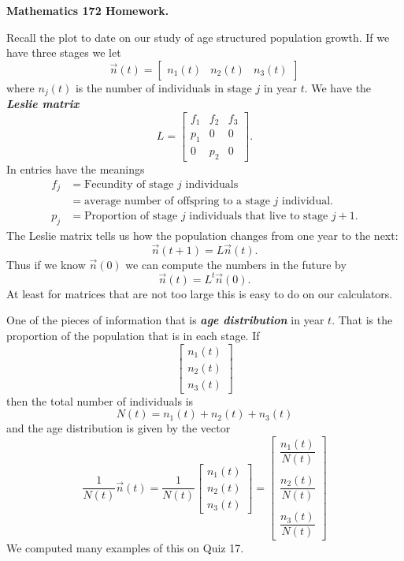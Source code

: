 \documentclass[11pt]{amsart}
\title[]{}
\newcommand{\bi}[1]{{\bf\itshape #1\/}}  %
\renewcommand{\(}{\left(}
\renewcommand{\)}{\right)}
\renewcommand{\[}{\left[}
\renewcommand{\]}{\right]}
\theoremstyle{definition}
\theoremstyle{remark}
\begin{document}
\thispagestyle{empty}

\centerline{\bf \large Mathematics 172 Homework.}



Recall the plot to date on our study of age structured population growth.
If we have three stages we let
$$
\vec n(t) = \[ \begin{matrix} n_1(t)& n_2(t) & n_3(t) \end{matrix}\]
$$
where $n_j(t)$ is the number of individuals in stage $j$ in year $t$.
We have the \bi{Leslie matrix} 
$$
L = \[ \begin{matrix}
f_1&f_2&  f_3\\
p_1 & 0& 0 \\
0& p_2& 0
\end{matrix}\].
$$
In entries have the meanings
\begin{align*}
f_j&=\text{Fecundity of stage $j$ individuals}\\
&= \text{average number of offspring to a stage $j$ individual.}\\ 
p_j& =\text{Proportion of stage $j$ individuals that live to stage $j+1$.}
\end{align*}
The Leslie matrix tells us how the population changes from one year to the next:
$$
\vec n(t+1) = L \vec n(t).
$$
Thus if we know $\vec n(0)$ we can compute the numbers in the future by
$$
\vec n(t) = L^t\vec n(0).
$$
At least for matrices that are not too large this is easy to do on our calculators.

One of the pieces of information that is \bi{age distribution} in year $t$.
That is the proportion of the population that is in each stage.
If
$$
\[ \begin{matrix} n_1(t)\\ n_2(t) \\ n_3(t) \end{matrix}\]
$$
then the total number of individuals is
$$
N(t) = n_1(t)+ n_2(t) + n_3(t) 
$$
and the age distribution is given by the vector
$$
\frac{1}{N(t)}\vec n(t)=
\frac{1}{N(t)}\[ \begin{matrix} n_1(t)\\ n_2(t) \\ n_3(t) \end{matrix}\]
=
\[ \begin{matrix} \dfrac{n_1(t)}{N(t)}\\
	\\ \dfrac{n_2(t)}{N(t)}\\ \\\dfrac{n_3(t)}{N(t)}\end{matrix}\]
$$
We computed many examples of this on Quiz 17.
\end{document}
